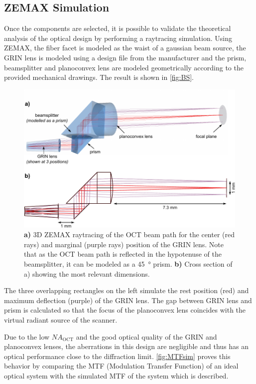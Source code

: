 \subsection{ZEMAX Simulation}

Once the components are selected, it is possible to validate the theoretical analysis of the optical design by  performing a raytracing simulation. Using ZEMAX, the fiber facet is modeled as the waist of a gaussian beam source, the  GRIN lens is modeled using a design file from the manufacturer and the prism, beamsplitter and planoconvex lens are modeled geometrically according to the provided mechanical drawings. The result is shown in \autoref{fig:BS}.

\begin{figure}[h!]\centering
      \includegraphics{figures/30_DesignSimulation/Optical/beamsplitterAll.pdf}
      \caption{\textbf{a)} 3D ZEMAX raytracing of the OCT beam path for the center (red rays) and marginal (purple rays) position of the GRIN lens. Note that as the OCT beam path is reflected in the hypotenuse of the beamsplitter, it can be modeled as a \SI{45}{\degree} prism.      
      \textbf{b)} Cross section of a) showing the most relevant dimensions.}
      \label{fig:BS}
\end{figure}

The three overlapping rectangles on the left simulate the rest position (red) and maximum deflection (purple) of the GRIN lens. The gap between GRIN lens and prism is calculated so that the focus of the planoconvex lens coincides with the virtual radiant source of the scanner.

	Due to the low $\mathit{NA_\mathrm{OCT}}$ and the good optical quality of the GRIN and planoconvex lenses, the aberrations in this design are negligible and thus has an optical performance close to the diffraction limit. \autoref{fig:MTFsim} proves this behavior by comparing the MTF (Modulation Transfer Function) of an ideal optical system with the simulated MTF of the system which is described.

